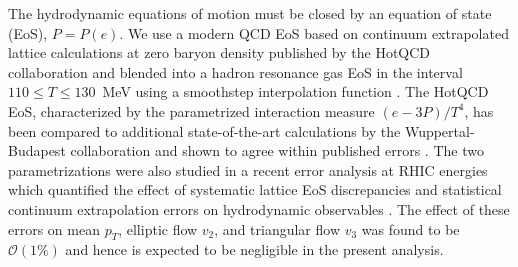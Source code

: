\documentclass[aps,prc,reprint,amsmath,nofootinbib]{revtex4-1}
\begin{document}
The hydrodynamic equations of motion must be closed by an equation of state (EoS), $P = P(e)$.
We use a modern QCD EoS based on continuum extrapolated lattice calculations at zero baryon density published by the HotQCD collaboration \cite{Bazavov:2014pvz} and blended into a hadron resonance gas EoS in the interval {$110 \le T \le 130$~MeV} using a smoothstep interpolation function \cite{Moreland:2015dvc}.
The HotQCD EoS, characterized by the parametrized interaction measure $(e - 3P)/T^4$, has been compared to additional state-of-the-art calculations by the Wuppertal-Budapest collaboration and shown to agree within published errors \cite{Bazavov:2014pvz}.
The two parametrizations were also studied in a recent error analysis at RHIC energies which quantified the effect of systematic lattice EoS discrepancies and statistical continuum extrapolation errors on hydrodynamic observables \cite{Moreland:2015dvc}.
The effect of these errors on mean $p_T$, elliptic flow $v_2$, and triangular flow $v_3$ was found to be $\mathcal O(1\%)$ and hence is expected to be negligible in the present analysis.
\end{document}

